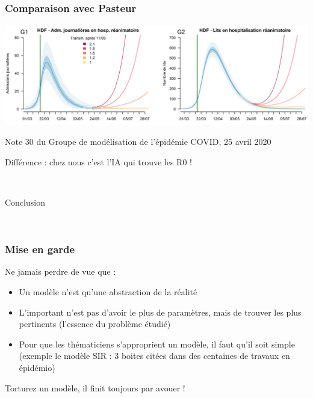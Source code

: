 \documentclass[a4paper]{cours-bdd}
\begin{document}

\begin{frame}[fragile]
  \frametitle{Comparaison avec Pasteur}

  \begin{center}
    \includegraphics[width=\linewidth]{Inserm+Pasteur_HdF.png}

    {\scriptsize Note 30 du Groupe de modélisation de l’épidémie COVID, 25 avril 2020}

    \bigskip
    
    \begin{block}{}
      \begin{center}
        Différence : chez nous c'est l'IA qui trouve les R0 !
      \end{center}
    \end{block}
  \end{center}

\end{frame}





\begin{frame}
  \hfill \
  \begin{center}
    \Huge
    Conclusion
  \end{center}
  \hfill \

\end{frame}


\begin{frame}[fragile]
  \frametitle{Mise en garde}

  Ne jamais perdre de vue que  :
  \begin{itemize}
  \item Un modèle n'est qu'une abstraction de la réalité
  \item L'important n'est pas d'avoir le plus de paramètres, mais de trouver les plus pertinents (l'essence du problème étudié)
  \item Pour que les thématiciens s'approprient un modèle, il faut qu'il soit simple (exemple le modèle SIR : 3 boites citées dans des centaines de travaux en épidémio)
  \end{itemize}

  \bigskip
  
  \begin{block}{}
    \begin{center}
  Torturez un modèle, il finit toujours par avouer !
\end{center}
\end{block}

\end{frame}
\end{document}

